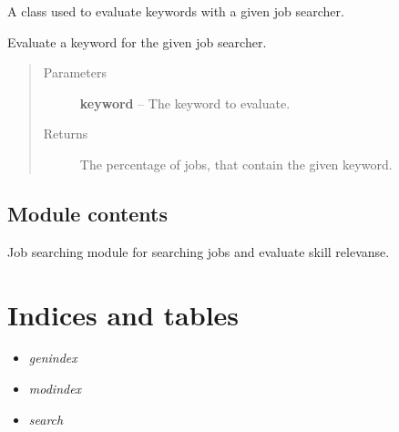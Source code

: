 \documentclass[letterpaper,10pt,english]{sphinxmanual}
\begin{document}
\begin{fulllineitems}
\label{job_searcher:job_searcher.keyword_evaluator.KeywordEvaluator}
A class used to evaluate keywords with a given job searcher.

\begin{fulllineitems}
\label{job_searcher:job_searcher.keyword_evaluator.KeywordEvaluator.evaluate_keyword}
Evaluate a keyword for the given job searcher.
\begin{quote}\begin{description}
\item[{Parameters}] \leavevmode
\textbf{keyword} -- The keyword to evaluate.

\item[{Returns}] \leavevmode
The percentage of jobs, that contain the given keyword.

\end{description}\end{quote}

\end{fulllineitems}


\end{fulllineitems}



\section{Module contents}
\label{job_searcher:module-job_searcher}\label{job_searcher:module-contents}
Job searching module for searching jobs and evaluate skill relevanse.


\chapter{Indices and tables}
\label{index:indices-and-tables}\begin{itemize}
\item {} 
\emph{genindex}

\item {} 
\emph{modindex}

\item {} 
\emph{search}

\end{itemize}
\end{document}
